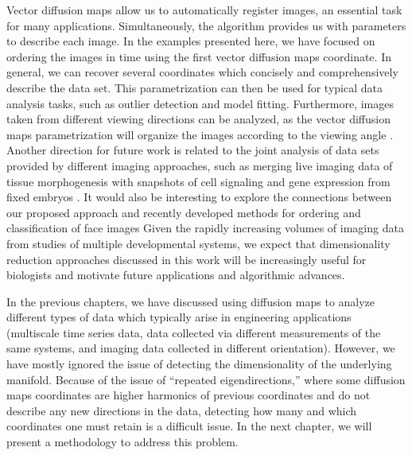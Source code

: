 Vector diffusion maps allow us to automatically register images, an essential task for many applications.
%
Simultaneously, the algorithm provides us with parameters to describe each image.
%
In the examples presented here, we have focused on ordering the images in time using the first vector diffusion maps coordinate.
%
In general, we can recover several coordinates which concisely and comprehensively describe the data set.
%
This parametrization can then be used for typical data analysis tasks, such as outlier detection and model fitting.
%
Furthermore, images taken from different viewing directions can be analyzed, as the vector diffusion maps parametrization will organize the images according to the viewing angle \citep{singer2011viewing}.
%
Another direction for future work is related to the joint analysis of data sets provided by different imaging approaches, such as merging live imaging data of tissue morphogenesis with snapshots of cell signaling and gene expression from fixed embryos \citep{krzic2012multiview, ichikawa2014live, rubel2010coupling, dsilva2013nonlinear}.
%
It would also be interesting to explore the connections between our proposed approach and recently developed methods for ordering and classification of face images \citep{kemelmacher2011exploring, kemelmacher2014illumination}
%
Given the rapidly increasing volumes of imaging data from studies of multiple developmental systems, we expect that dimensionality reduction approaches discussed in this work will be increasingly useful for biologists and motivate future applications and algorithmic advances.

In the previous chapters, we have discussed using diffusion maps to analyze different types of data which typically arise in engineering applications (multiscale time series data, data collected via different measurements of the same systems, and imaging data collected in different orientation).
%
However, we have mostly ignored the issue of detecting the dimensionality of the underlying manifold.
%
Because of the issue of ``repeated eigendirections,'' where some diffusion maps coordinates are higher harmonics of previous coordinates and do not describe any new directions in the data, detecting how many and which coordinates one must retain is a difficult issue. 
%
In the next chapter, we will present a methodology to address this problem.
